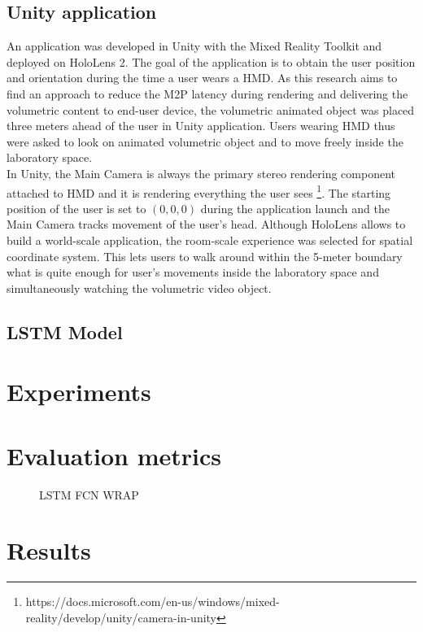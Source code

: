 \subsection{Unity application}
\label{sec:imp:programming:unity}
An application was developed in Unity with the Mixed Reality Toolkit and deployed on HoloLens 2. The goal of the application is to obtain the user position and orientation during the time a user wears a HMD. As this research aims to find an approach to reduce the M2P latency during rendering and delivering the volumetric content to end-user device, the volumetric animated object was placed three meters ahead of the user in Unity application. Users wearing HMD thus were asked to look on animated volumetric object and to move freely inside the laboratory space.\\
In Unity, the Main Camera is always the primary stereo rendering component attached to HMD and it is rendering everything the user sees \footnote{https://docs.microsoft.com/en-us/windows/mixed-reality/develop/unity/camera-in-unity}. The starting position of the user is set to $(0, 0, 0)$ during the application launch and the Main Camera tracks movement of the user's head. Although HoloLens allows to build a world-scale application, the room-scale experience was selected for spatial coordinate system. This lets users to walk around within the 5-meter boundary what is quite enough for user's movements inside the laboratory space and simultaneously watching the volumetric video object. 

\subsection{LSTM Model}
\label{sec:imp:programming:model}

\section{Experiments}
\label{sec:imp:experiments}


\section{Evaluation metrics}
\label{sec:imp:eval}


\begin{figure}
	\centering
	\caption{LSTM FCN WRAP}
	\label{fig:nn2}
\end{figure}


\section{Results}
\label{sec:imp:results}

